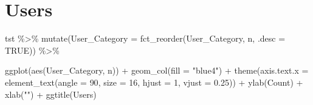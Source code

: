 \documentclass[
]{article}
\newenvironment{Shaded}{\begin{snugshade}}{\end{snugshade}}
\newcommand{\AttributeTok}[1]{\textcolor[rgb]{0.77,0.63,0.00}{#1}}
\newcommand{\CommentTok}[1]{\textcolor[rgb]{0.56,0.35,0.01}{\textit{#1}}}
\newcommand{\ConstantTok}[1]{\textcolor[rgb]{0.00,0.00,0.00}{#1}}
\newcommand{\DecValTok}[1]{\textcolor[rgb]{0.00,0.00,0.81}{#1}}
\newcommand{\FloatTok}[1]{\textcolor[rgb]{0.00,0.00,0.81}{#1}}
\newcommand{\FunctionTok}[1]{\textcolor[rgb]{0.00,0.00,0.00}{#1}}
\newcommand{\NormalTok}[1]{#1}
\newcommand{\OtherTok}[1]{\textcolor[rgb]{0.56,0.35,0.01}{#1}}
\newcommand{\SpecialCharTok}[1]{\textcolor[rgb]{0.00,0.00,0.00}{#1}}
\newcommand{\StringTok}[1]{\textcolor[rgb]{0.31,0.60,0.02}{#1}}
\begin{document}
\hypertarget{users}{%
\section{Users}\label{users}}

\begin{Shaded}
\end{Shaded}

\begin{Shaded}
\begin{Highlighting}[]
\NormalTok{tst }\SpecialCharTok{\%\textgreater{}\%}
  \FunctionTok{mutate}\NormalTok{(}\AttributeTok{User\_Category =} \FunctionTok{fct\_reorder}\NormalTok{(User\_Category, n, }\AttributeTok{.desc =} \ConstantTok{TRUE}\NormalTok{)) }\SpecialCharTok{\%\textgreater{}\%}
  
  \FunctionTok{ggplot}\NormalTok{(}\FunctionTok{aes}\NormalTok{(User\_Category, n)) }\SpecialCharTok{+}
  \FunctionTok{geom\_col}\NormalTok{(}\AttributeTok{fill =} \StringTok{"blue4"}\NormalTok{) }\SpecialCharTok{+}
  \FunctionTok{theme}\NormalTok{(}\AttributeTok{axis.text.x =} \FunctionTok{element\_text}\NormalTok{(}\AttributeTok{angle =} \DecValTok{90}\NormalTok{, }\AttributeTok{size =} \DecValTok{16}\NormalTok{,}
                                   \AttributeTok{hjust =} \DecValTok{1}\NormalTok{, }\AttributeTok{vjust =} \FloatTok{0.25}\NormalTok{)) }\SpecialCharTok{+}
  \FunctionTok{ylab}\NormalTok{(}\StringTok{\textquotesingle{}Count\textquotesingle{}}\NormalTok{) }\SpecialCharTok{+}
  \FunctionTok{xlab}\NormalTok{(}\StringTok{""}\NormalTok{) }\SpecialCharTok{+}
  \FunctionTok{ggtitle}\NormalTok{(}\StringTok{\textquotesingle{}Users\textquotesingle{}}\NormalTok{)}
\end{Highlighting}
\end{Shaded}
\end{document}
